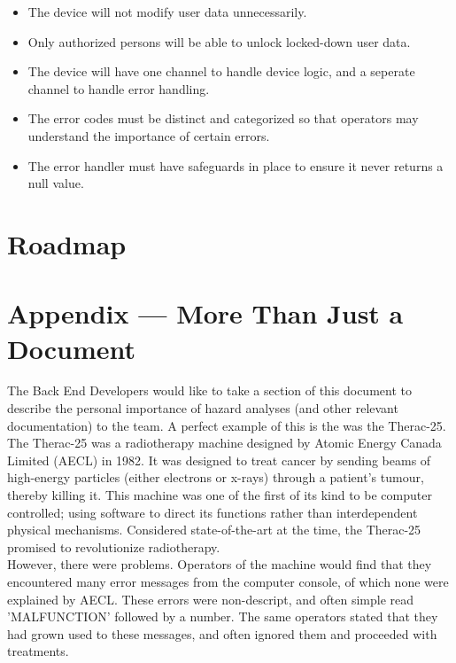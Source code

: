 \documentclass{article}
\begin{document}

\begin{itemize}
\item The device will not modify user data unnecessarily.
\item Only authorized persons will be able to unlock locked-down user data.
\item The device will have one channel to handle device logic, and a seperate channel to handle error handling.
\item The error codes must be distinct and categorized so that operators may understand the importance of certain errors.
\item The error handler must have safeguards in place to ensure it never returns a null value.
\end{itemize}

\section{Roadmap}


\section*{Appendix --- More Than Just a Document}

The Back End Developers would like to take a section of this document to describe the personal importance of hazard analyses (and other relevant documentation) to the team. A perfect example of this is the was the Therac-25.\\

The Therac-25 was a radiotherapy machine designed by Atomic Energy Canada Limited (AECL) in 1982. It was designed to treat cancer by sending beams of high-energy particles (either electrons or x-rays) through a patient's tumour, thereby killing it. This machine was one of the first of its kind to be computer controlled; using software to direct its functions rather than interdependent physical mechanisms. \cite{leveson-1999} Considered state-of-the-art at the time, the Therac-25 promised to revolutionize radiotherapy.\\

However, there were problems. Operators of the machine would find that they encountered many error messages from the computer console, of which none were explained by AECL. These errors were non-descript, and often simple read 'MALFUNCTION' followed by a number. The same operators stated that they had grown used to these messages, and often ignored them and proceeded with treatments.\\
\end{document}
